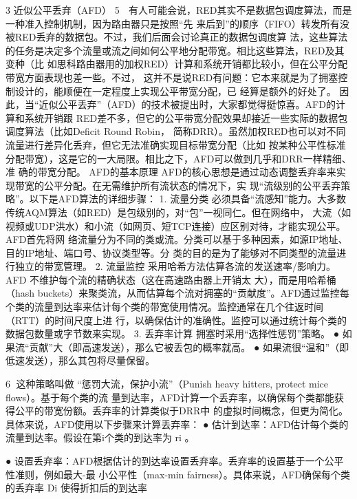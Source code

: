 3 近似公平丢弃（AFD）
                                                5
    有人可能会说，RED其实不是数据包调度算法，而是一种准入控制机制，因为路由器只是按照“先
来后到”的顺序（FIFO）转发所有没被RED丢弃的数据包。不过，我们后面会讨论真正的数据包调度算
法，这些算法的任务是决定多个流量或流之间如何公平地分配带宽。相比这些算法，RED及其变种（比
如思科路由器用的加权RED）计算和系统开销都比较小，但在公平分配带宽方面表现也差一些。不过，
这并不是说RED有问题：它本来就是为了拥塞控制设计的，能顺便在一定程度上实现公平带宽分配，已
经算是额外的好处了。
    因此，当“近似公平丢弃”（AFD）的技术被提出时，大家都觉得挺惊喜。AFD的计算和系统开销跟
RED差不多，但它的公平带宽分配效果却接近一些实际的数据包调度算法（比如Deficit Round Robin，
简称DRR）。虽然加权RED也可以对不同流量进行差异化丢弃，但它无法准确实现目标带宽分配（比如
按某种公平性标准分配带宽），这是它的一大局限。相比之下，AFD可以做到几乎和DRR一样精细、准
确的带宽分配。
AFD的基本原理
AFD的核心思想是通过动态调整丢弃率来实现带宽的公平分配。在无需维护所有流状态的情况下，实
现“流级别的公平丢弃策略”。以下是AFD算法的详细步骤：
1. 流量分类
必须具备“流感知”能力。大多数传统AQM算法（如RED）是包级别的，对“包”一视同仁。但在网络中，
大流（如视频或UDP洪水）和小流（如网页、短TCP连接）应区别对待，才能实现公平。AFD首先将网
络流量分为不同的类或流。分类可以基于多种因素，如源IP地址、目的IP地址、端口号、协议类型等。分
类的目的是为了能够对不同类型的流量进行独立的带宽管理。
2. 流量监控
采用哈希方法估算各流的发送速率/影响力。AFD 不维护每个流的精确状态（这在高速路由器上开销太
大），而是用哈希桶（hash buckets）来聚类流，从而估算每个流对拥塞的“贡献度”。AFD通过监控每
个类的流量到达率来估计每个类的带宽使用情况。监控通常在几个往返时间（RTT）的时间尺度上进
行，以确保估计的准确性。监控可以通过统计每个类的数据包数量或字节数来实现。
3. 丢弃率计算
拥塞时采用“选择性惩罚”策略。
 ● 如果流“贡献”大（即高速发送），那么它被丢包的概率就高。
 ● 如果流很“温和”（即低速发送），那么其包将尽量保留。




                                                       6
这种策略叫做 “惩罚大流，保护小流”（Punish heavy hitters, protect mice flows）。基于每个类的流
量到达率，AFD计算一个丢弃率，以确保每个类都能获得公平的带宽份额。丢弃率的计算类似于DRR中
的虚拟时间概念，但更为简化。具体来说，AFD使用以下步骤来计算丢弃率：
 ● 估计到达率：AFD估计每个类的流量到达率。假设在第i个类的到达率为 ri 。                ​




 ● 设置丢弃率：AFD根据估计的到达率设置丢弃率。丢弃率的设置基于一个公平性准则，例如最大-最
   小公平性（max-min fairness）。具体来说，AFD确保每个类的丢弃率 Di 使得折扣后的到达率     ​




